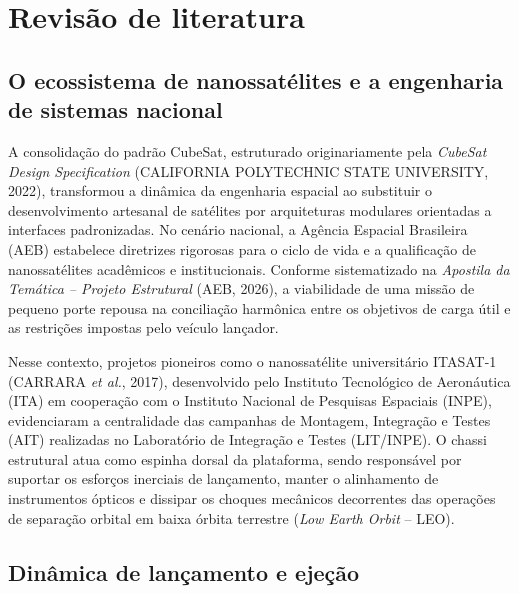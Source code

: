 \chapter{Revisão de literatura}
\label{cap:revisao}

\section{O ecossistema de nanossatélites e a engenharia de sistemas nacional}
\label{sec:ecossistema}

A consolidação do padrão CubeSat, estruturado originariamente pela \textit{CubeSat Design Specification} (CALIFORNIA POLYTECHNIC STATE UNIVERSITY, 2022), transformou a dinâmica da engenharia espacial ao substituir o desenvolvimento artesanal de satélites por arquiteturas modulares orientadas a interfaces padronizadas. No cenário nacional, a Agência Espacial Brasileira (AEB) estabelece diretrizes rigorosas para o ciclo de vida e a qualificação de nanossatélites acadêmicos e institucionais. Conforme sistematizado na \textit{Apostila da Temática -- Projeto Estrutural} (AEB, 2026), a viabilidade de uma missão de pequeno porte repousa na conciliação harmônica entre os objetivos de carga útil e as restrições impostas pelo veículo lançador. 

Nesse contexto, projetos pioneiros como o nanossatélite universitário ITASAT-1 (CARRARA \textit{et al.}, 2017), desenvolvido pelo Instituto Tecnológico de Aeronáutica (ITA) em cooperação com o Instituto Nacional de Pesquisas Espaciais (INPE), evidenciaram a centralidade das campanhas de Montagem, Integração e Testes (AIT) realizadas no Laboratório de Integração e Testes (LIT/INPE). O chassi estrutural atua como espinha dorsal da plataforma, sendo responsável por suportar os esforços inerciais de lançamento, manter o alinhamento de instrumentos ópticos e dissipar os choques mecânicos decorrentes das operações de separação orbital em baixa órbita terrestre (\textit{Low Earth Orbit} -- LEO).

\section{Dinâmica de lançamento e ejeção}
\label{sec:dinamica-ejecao}

